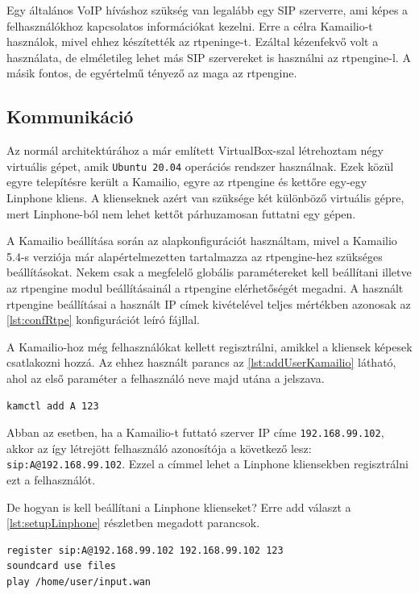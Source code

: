 Egy általános VoIP híváshoz szükség van legalább egy SIP szerverre, ami képes a 
felhasználókhoz kapcsolatos információkat kezelni. Erre a célra Kamailio-t használok, 
mivel ehhez készítették az rtpeninge-t. Ezáltal kézenfekvő volt a használata, de 
elméletileg lehet más SIP szervereket is használni az rtpengine-l. A másik fontos, de 
egyértelmű tényező az maga az rtpengine.

\subsection{Kommunikáció}

Az normál architektúrához a már említett VirtualBox-szal létrehoztam négy virtuális gépet,
amik \texttt{Ubuntu 20.04} operációs rendszer használnak. Ezek közül egyre telepítésre 
került a Kamailio, egyre az rtpengine és kettőre egy-egy Linphone kliens. A klienseknek 
azért van szüksége két különböző virtuális gépre, mert Linphone-ból nem lehet kettőt
párhuzamosan futtatni egy gépen.

A Kamailio beállítása során az alapkonfigurációt használtam, mivel a Kamailio 5.4-s verziója már alapértelmezetten tartalmazza az rtpengine-hez szükséges beállításokat. Nekem csak a megfelelő globális paramétereket kell beállítani illetve az rtpengine modul beállításainál a rtpengine elérhetőségét megadni. A használt rtpengine beállításai a használt IP címek kivételével teljes mértékben azonosak az \ref{lst:confRtpe} konfigurációt leíró fájllal. 

A Kamailio-hoz még felhasználókat kellett regisztrálni, amikkel a kliensek képesek 
csatlakozni hozzá. Az ehhez használt parancs az \ref{lst:addUserKamailio} látható, ahol 
az első paraméter a felhasználó neve majd utána a jelszava.

\begin{lstlisting}[caption=Felhasználó hozzáadása Kamailio-hoz, label=lst:addUserKamailio]
kamctl add A 123
\end{lstlisting}

Abban az esetben, ha a Kamailio-t futtató szerver IP címe \texttt{192.168.99.102}, akkor az így létrejött felhasználó azonosítója a következő lesz: \texttt{sip:A@192.168.99.102}. Ezzel a címmel lehet a Linphone kliensekben regisztrálni ezt a felhasználót. 

De hogyan is kell beállítani a Linphone klienseket? Erre add választ a \ref{lst:setupLinphone} részletben megadott parancsok. 

\begin{lstlisting}[caption=Linphone beállítása, label=lst:setupLinphone]
register sip:A@192.168.99.102 192.168.99.102 123
soundcard use files
play /home/user/input.wan
\end{lstlisting}

